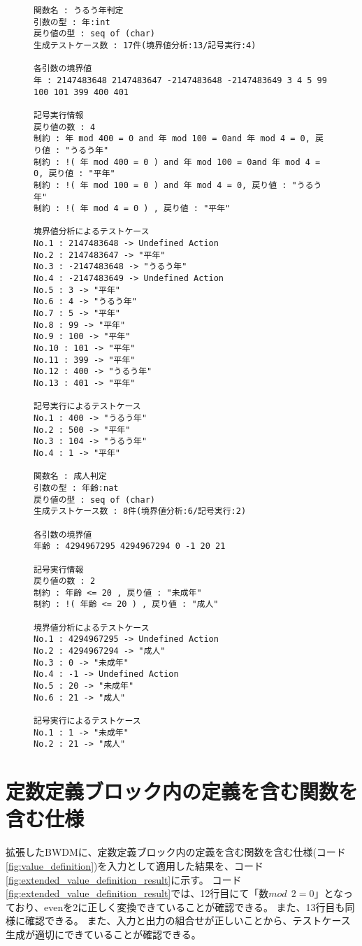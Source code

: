 \documentclass[uplatex, report, a4j, 10pt]{jsbook}
\begin{document}
\lstset{language=}
\begin{figure}[tp]
  \begin{lstlisting}[caption=拡張したBWDMに複数の関数を含む仕様(コード\ref{fig:func_multiple})を適用した際の出力,label=fig:extended_func_multiple_result]
関数名 : うるう年判定
引数の型 : 年:int 
戻り値の型 : seq of (char)
生成テストケース数 : 17件(境界値分析:13/記号実行:4)

各引数の境界値
年 : 2147483648 2147483647 -2147483648 -2147483649 3 4 5 99 100 101 399 400 401 

記号実行情報
戻り値の数 : 4
制約 : 年 mod 400 = 0 and 年 mod 100 = 0and 年 mod 4 = 0, 戻り値 : "うるう年"
制約 : !( 年 mod 400 = 0 ) and 年 mod 100 = 0and 年 mod 4 = 0, 戻り値 : "平年"
制約 : !( 年 mod 100 = 0 ) and 年 mod 4 = 0, 戻り値 : "うるう年"
制約 : !( 年 mod 4 = 0 ) , 戻り値 : "平年"

境界値分析によるテストケース
No.1 : 2147483648 -> Undefined Action
No.2 : 2147483647 -> "平年"
No.3 : -2147483648 -> "うるう年"
No.4 : -2147483649 -> Undefined Action
No.5 : 3 -> "平年"
No.6 : 4 -> "うるう年"
No.7 : 5 -> "平年"
No.8 : 99 -> "平年"
No.9 : 100 -> "平年"
No.10 : 101 -> "平年"
No.11 : 399 -> "平年"
No.12 : 400 -> "うるう年"
No.13 : 401 -> "平年"

記号実行によるテストケース
No.1 : 400 -> "うるう年"
No.2 : 500 -> "平年"
No.3 : 104 -> "うるう年"
No.4 : 1 -> "平年"

関数名 : 成人判定
引数の型 : 年齢:nat 
戻り値の型 : seq of (char)
生成テストケース数 : 8件(境界値分析:6/記号実行:2)

各引数の境界値
年齢 : 4294967295 4294967294 0 -1 20 21 

記号実行情報
戻り値の数 : 2
制約 : 年齢 <= 20 , 戻り値 : "未成年"
制約 : !( 年齢 <= 20 ) , 戻り値 : "成人"

境界値分析によるテストケース
No.1 : 4294967295 -> Undefined Action
No.2 : 4294967294 -> "成人"
No.3 : 0 -> "未成年"
No.4 : -1 -> Undefined Action
No.5 : 20 -> "未成年"
No.6 : 21 -> "成人"

記号実行によるテストケース
No.1 : 1 -> "未成年"
No.2 : 21 -> "成人"

\end{lstlisting}
\end{figure}

\section{定数定義ブロック内の定義を含む関数を含む仕様}\label{sec:tekiyou_value}
拡張したBWDMに、定数定義ブロック内の定義を含む関数を含む仕様(コード\ref{fig:value_definition})を入力として適用した結果を、コード\ref{fig:extended_value_definition_result}に示す。
コード\ref{fig:extended_value_definition_result}では、12行目にて「$数 mod ~~ 2 = 0$」となっており、evenを2に正しく変換できていることが確認できる。
また、13行目も同様に確認できる。
また、入力と出力の組合せが正しいことから、テストケース生成が適切にできていることが確認できる。
\end{document}
